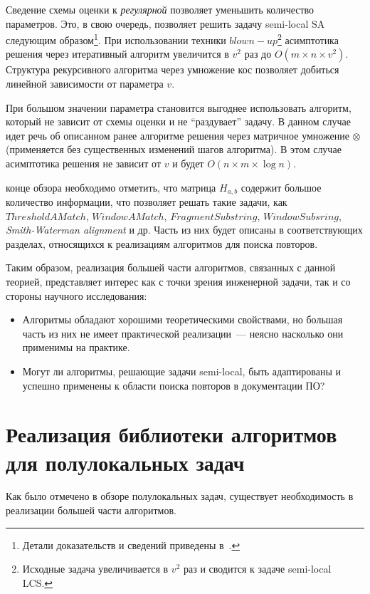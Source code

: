 Сведение схемы оценки к \emph{регулярной} позволяет уменьшить количество параметров.
Это, в свою очередь, позволяет решить задачу {semi-local SA} следующим образом\footnote{Детали доказательств и сведений приведены в~\cite{tiskin2006all}.}. 
При использовании техники $blown-up$\footnote{Исходные задача увеличивается в $v^2$ раз и сводится к задаче {semi-local LCS}.} асимптотика решения через  итеративный алгоритм увеличится в $v^2$ раз до $O(m \times n \times v^2)$.
Структура рекурсивного алгоритма через умножение кос позволяет добиться линейной зависимости от параметра $v$. 

При большом значении параметра становится выгоднее использовать алгоритм, который не зависит от схемы оценки и не ``раздувает'' задачу. 
В данном случае идет речь об описанном ранее алгоритме решения через матричное умножение $\otimes$ (применяется без существенных изменений шагов алгоритма). 
В этом случае асимптотика решения не зависит от $v$ и будет $O(  n \times m \times \log n)$.

\vspace{4 mm}
 конце обзора необходимо отметить, что матрица $H_{a,b}$ содержит большое количество информации, что позволяет решать такие задачи, как $ThresholdAMatch$, $WindowAMatch$, $FragmentSubstring$, $WindowSubsring$, \emph{Smith-Waterman alignment} и др.
Часть из них будет описаны в соответствующих разделах, относящихся к реализациям алгоритмов для поиска повторов.

Таким образом, реализация большей части алгоритмов, связанных с данной теорией, представляет интерес как с точки зрения инженерной задачи, так и со стороны научного исследования:
\begin{itemize}
    \item Алгоритмы обладают хорошими  теоретическими свойствами, но большая часть из них не имеет практической реализации~--- неясно насколько они применимы на практике.
    \item Могут ли алгоритмы, решающие задачи {semi-local}, быть адаптированы и успешно применены к области поиска повторов в документации ПО?
\end{itemize}



\section{Реализация библиотеки алгоритмов для полулокальных задач}\label{librarySection}
Как было отмечено в обзоре полулокальных задач,
существует необходимость в реализации большей части алгоритмов.

